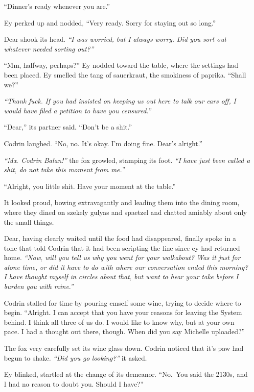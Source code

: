 ``Dinner's ready whenever you are.''

Ey perked up and nodded, ``Very ready. Sorry for staying out so long.''

Dear shook its head. \emph{``I was worried, but I always worry. Did you sort out whatever needed sorting out?''}

``Mm, halfway, perhaps?'' Ey nodded toward the table, where the settings had been placed. Ey smelled the tang of sauerkraut, the smokiness of paprika. ``Shall we?''

\emph{``Thank fuck. If you had insisted on keeping us out here to talk our ears off, I would have filed a petition to have you censured.''}

``Dear,'' its partner said. ``Don't be a shit.''

Codrin laughed. ``No, no. It's okay. I'm doing fine. Dear's alright.''

\emph{``Mx. Codrin Balan!''} the fox growled, stamping its foot. \emph{``I have just been called a shit, do not take this moment from me.''}

``Alright, you little shit. Have your moment at the table.''

It looked proud, bowing extravagantly and leading them into the dining room, where they dined on szekely gulyas and spaetzel and chatted amiably about only the small things.

Dear, having clearly waited until the food had disappeared, finally spoke in a tone that told Codrin that it had been scripting the line since ey had returned home. \emph{``Now, will you tell us why you went for your walkabout? Was it just for alone time, or did it have to do with where our conversation ended this morning? I have thought myself in circles about that, but want to hear your take before I burden you with mine.''}

Codrin stalled for time by pouring emself some wine, trying to decide where to begin. ``Alright. I can accept that you have your reasons for leaving the System behind. I think all three of us do. I would like to know why, but at your own pace. I had a thought out there, though. When did you say Michelle uploaded?''

The fox very carefully set its wine glass down. Codrin noticed that it's paw had begun to shake. \emph{``Did you go looking?''} it asked.

Ey blinked, startled at the change of its demeanor. ``No.~You said the 2130s, and I had no reason to doubt you. Should I have?''

